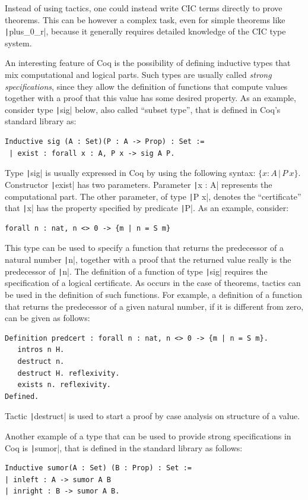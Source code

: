 \documentclass[review]{elsarticle}
\newcommand{\coq}[1]{\texttt|#1|}
\theoremstyle{definition}
\begin{document}
Instead of using tactics, one could instead write CIC terms directly
to prove theorems.  This can be however a complex task, even for
simple theorems like \coq{plus_0_r}, because it generally requires
detailed knowledge of the CIC type system.

An interesting feature of Coq is the possibility of defining inductive
types that mix computational and logical parts. Such types are usually
called \emph{strong specifications}, since they allow the definition
of functions that compute values together with a proof that this value
has some desired property. As an example, consider type \coq{sig}
below, also called ``subset type'', that is defined in Coq's standard
library as:
\begin{verbatim}
Inductive sig (A : Set)(P : A -> Prop) : Set :=
 | exist : forall x : A, P x -> sig A P.
\end{verbatim}

Type \coq{sig} is usually expressed in Coq by using the following
syntax: $\{x : A \,\vert\,P\:x\}$.
Constructor \coq{exist} has two
parameters. Parameter \coq{x : A} represents the
computational part. The other parameter, of type \coq{P x}, denotes
the ``certificate'' that \coq{x} has the property specified by
predicate \coq{P}. As an example, consider:
\begin{verbatim}
forall n : nat, n <> 0 -> {m | n = S m}
\end{verbatim}
This type can be used to specify a function that returns the
predecessor of a natural number \coq{n}, together with a proof that
the returned value really is the predecessor of \coq{n}. The
definition of a function of type \coq{sig} requires the specification
of a logical certificate. As occurs in the case of theorems, tactics
can be used in the definition of such functions. For example, a
definition of a function that returns the predecessor of a given
natural number, if it is different from zero, can be given as follows:

\begin{verbatim}
Definition predcert : forall n : nat, n <> 0 -> {m | n = S m}.
   intros n H.
   destruct n.
   destruct H. reflexivity.
   exists n. reflexivity.
Defined.
\end{verbatim}

Tactic \coq{destruct} is used to start a proof by case analysis on
structure of a value.

Another example of a type that can be used to provide strong
specifications in Coq is \coq{sumor}, that is defined in the
standard library as follows:
\begin{verbatim}
Inductive sumor(A : Set) (B : Prop) : Set :=
| inleft : A -> sumor A B
| inright : B -> sumor A B.
\end{verbatim}
\end{document}

